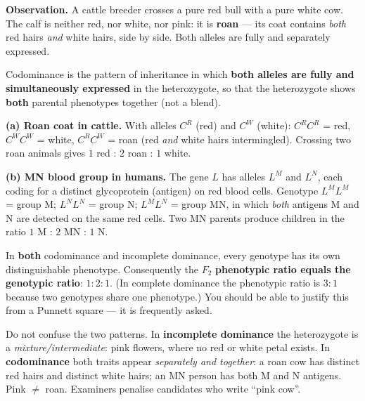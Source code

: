 \documentclass[11pt]{article}
\newcommand{\cle}[1]{{\popxbold\color{popdark}#1}}
\newcounter{popsec}
\newcounter{popsub}
\newcommand{\courssub}[1]{%
  \stepcounter{popsub}%
  \par\vspace{9pt}\noindent{\popxbold\fontsize{11.5}{13}\selectfont\color{popink}{\color{poporange}\thepopsec.\thepopsub}\hspace{6pt}#1}\par\nopagebreak\vspace{4pt}
}
\begin{document}
\courssub{Codominance}

\textbf{Observation.} A cattle breeder crosses a pure red bull with a pure white cow. The calf is neither red, nor white, nor pink: it is \textbf{roan} --- its coat contains \emph{both} red hairs \emph{and} white hairs, side by side. Both alleles are fully and separately expressed.

\begin{definition}[Codominance]
\cle{Codominance} is the pattern of inheritance in which \textbf{both alleles are fully and simultaneously expressed} in the heterozygote, so that the heterozygote shows \textbf{both} parental phenotypes together (not a blend).
\end{definition}

\begin{exemplebox}
\textbf{(a) Roan coat in cattle.} With alleles $C^R$ (red) and $C^W$ (white): $C^R C^R$ = red, $C^W C^W$ = white, $C^R C^W$ = roan (red \emph{and} white hairs intermingled). Crossing two roan animals gives $1$ red : $2$ roan : $1$ white.

\textbf{(b) MN blood group in humans.} The gene $L$ has alleles $L^M$ and $L^N$, each coding for a distinct glycoprotein (antigen) on red blood cells. Genotype $L^M L^M$ = group M; $L^N L^N$ = group N; $L^M L^N$ = group MN, in which \emph{both} antigens M and N are detected on the same red cells. Two MN parents produce children in the ratio $1$ M : $2$ MN : $1$ N.
\end{exemplebox}

\begin{propriete}
In \textbf{both} codominance and incomplete dominance, every genotype has its own distinguishable phenotype. Consequently the $F_2$ \textbf{phenotypic ratio equals the genotypic ratio}: $1:2:1$. (In complete dominance the phenotypic ratio is $3:1$ because two genotypes share one phenotype.) You should be able to justify this from a Punnett square --- it is frequently asked.
\end{propriete}

\begin{attention}
Do not confuse the two patterns. In \textbf{incomplete dominance} the heterozygote is a \emph{mixture/intermediate}: pink flowers, where no red or white petal exists. In \textbf{codominance} both traits appear \emph{separately and together}: a roan cow has distinct red hairs and distinct white hairs; an MN person has both M and N antigens. Pink $\neq$ roan. Examiners penalise candidates who write ``pink cow''.
\end{attention}
\end{document}
